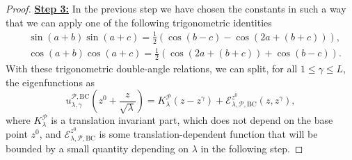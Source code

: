 \documentclass{amsart}
\theoremstyle{definition}
\theoremstyle{remark}
\renewcommand\leq\leqslant
\numberwithin{equation}{section}
\theoremstyle{definition}
\theoremstyle{remark}
\begin{document}
\begin{proof}
\textbf{	\underline{Step 3:}}	In the previous step we have chosen the constants in such a way that we can apply one of the following trigonometric identities  \begin{equation}
		\begin{aligned}
			&\sin(a+b)\sin(a+c)=\frac{1}{2}\left(\cos(b-c)-\cos(2a+(b+c))\right),\\&
			\cos(a+b)\cos(a+c)=\frac{1}{2}\left(\cos(2a+(b+c))+\cos(b-c)\right).
		\end{aligned}
	\end{equation} With these trigonometric double-angle relations, we can split, for all $1\leq \gamma\leq L$, the eigenfunctions as
	\begin{equation}\label{parts}
		u_{\lambda,\gamma}^{\mathcal{P},\mathrm{BC}}\left(z^0+\frac{z}{\sqrt{\lambda}}\right)=K_{\lambda}^\mathcal{P}(z-z^\gamma)+\mathcal{E}_{\lambda,\mathcal{P},\mathrm{BC}}^{z^0}(z,z^\gamma),
	\end{equation} where $K_{\lambda}^\mathcal{P}$ is a translation invariant part, which does not depend on the base point $z^0$, and $\mathcal{E}_{\lambda,\mathcal{P},\mathrm{BC}}^{z^0}$ is some translation-dependent function that will be bounded by a small quantity depending on $\lambda$ in the following step.
	

\end{proof}
\end{document}
